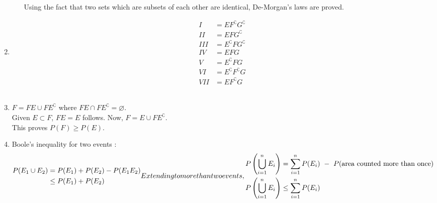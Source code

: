 \begin{enumerate}
\begin{enumerate}
		Using the fact that two sets which are subsets of each other are identical, De-Morgan's laws are proved. \\
		
	\end{enumerate}
	
	\item \begin{subequations}
		\begin{align}
			I &= E F^\complement G^\complement \\
			II &= E F G^\complement \\
			III &= E^\complement F G^\complement \\
			IV &= EFG \\
			V &= E^\complement F G \\
			VI &= E^\complement F^\complement G \\
			VII &= E F^\complement G
		\end{align}
	\end{subequations}\\
	
	\item $ F = FE \cup F E^\complement $ where $ FE \cap F E^\complement = \varnothing $. \\
	Given $ E \subset F $, $ FE = E $ follows. Now, $ F = E \cup F E^\complement $. \\
	This proves $ P(F) \geq P(E) $. \\
	
	\item Boole's inequality for two events : 
	\begin{subequations}
		\begin{align}
			P(E_1 \cup E_2) &= P(E_1) + P(E_2) - P(E_1 E_2)\\
			& \leq P(E_1) + P(E_2)
		\end{align}
		
		Extending to more than two events, \\
		
		\begin{align}
			P \left( \bigcup_{i = 1}^{n} E_i \right) &= \sum\limits_{i = 1}^{n} P(E_i) \ - \ P(\text{area counted more than once}) \\
			P \left( \bigcup_{i = 1}^{n} E_i \right) &\leq \sum\limits_{i = 1}^{n} P(E_i)
		\end{align}
	\end{subequations}\\
	

\end{enumerate}
